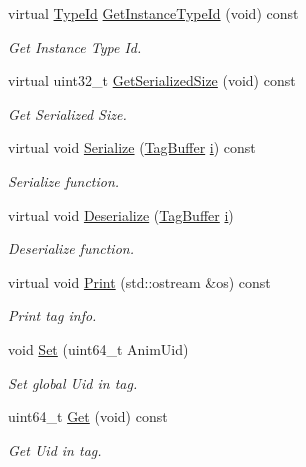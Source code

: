 \begin{DoxyCompactItemize}
\item 
virtual \hyperlink{classns3_1_1TypeId}{Type\+Id} \hyperlink{classns3_1_1AnimByteTag_a79c07c6669e8132f9236b465044ae73e}{Get\+Instance\+Type\+Id} (void) const 
\begin{DoxyCompactList}\small\item\em Get Instance Type Id. \end{DoxyCompactList}\item 
virtual uint32\+\_\+t \hyperlink{classns3_1_1AnimByteTag_a568f1fe9ed42b024d33e1cb9582084e5}{Get\+Serialized\+Size} (void) const 
\begin{DoxyCompactList}\small\item\em Get Serialized Size. \end{DoxyCompactList}\item 
virtual void \hyperlink{classns3_1_1AnimByteTag_a3f8123f5cb3ad0871dcff1d2fb0f2da4}{Serialize} (\hyperlink{classns3_1_1TagBuffer}{Tag\+Buffer} \hyperlink{lte__uplink__power__control_8m_a6f6ccfcf58b31cb6412107d9d5281426}{i}) const 
\begin{DoxyCompactList}\small\item\em Serialize function. \end{DoxyCompactList}\item 
virtual void \hyperlink{classns3_1_1AnimByteTag_a559897af13264a8c9b15ec430a96f4d0}{Deserialize} (\hyperlink{classns3_1_1TagBuffer}{Tag\+Buffer} \hyperlink{lte__uplink__power__control_8m_a6f6ccfcf58b31cb6412107d9d5281426}{i})
\begin{DoxyCompactList}\small\item\em Deserialize function. \end{DoxyCompactList}\item 
virtual void \hyperlink{classns3_1_1AnimByteTag_a690cc010346d031f63f9ebb9e0cfb6f3}{Print} (std\+::ostream \&os) const 
\begin{DoxyCompactList}\small\item\em Print tag info. \end{DoxyCompactList}\item 
void \hyperlink{classns3_1_1AnimByteTag_afb5fab6b187bb5be5bb56f10e3baa946}{Set} (uint64\+\_\+t Anim\+Uid)
\begin{DoxyCompactList}\small\item\em Set global Uid in tag. \end{DoxyCompactList}\item 
uint64\+\_\+t \hyperlink{classns3_1_1AnimByteTag_ab3bc600ce092dac444a4ef2a567e2152}{Get} (void) const 
\begin{DoxyCompactList}\small\item\em Get Uid in tag. \end{DoxyCompactList}\end{DoxyCompactItemize}
